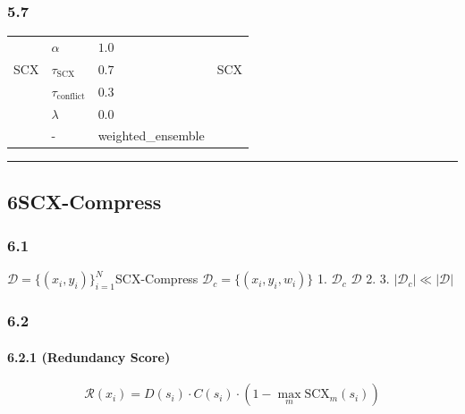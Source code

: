\documentclass[
  12pt,
]{article}
\begin{document}
\subsubsection{5.7 }\label{ux5173ux952eux8d85ux53c2ux6570-4}

\begin{longtable}[]{@{}llll@{}}
\toprule\noalign{}
 &  &  &  \\
\midrule\noalign{}
\endhead
\bottomrule\noalign{}
\endlastfoot
 & \(\alpha\) & \(1.0\) &  \\
SCX  & \(\tau_{\text{SCX}}\) & \(0.7\) & 
SCX \\
 & \(\tau_{\text{conflict}}\) & \(0.3\) &  \\
 & \(\lambda\) & \(0.0\) &  \\
 & - & weighted\_ensemble &  \\
\end{longtable}

\begin{center}\rule{0.5\linewidth}{0.5pt}\end{center}

\subsection{
6SCX-Compress}\label{ux6a21ux5757-6scx-compressux5197ux4f59ux538bux7f29}

\subsubsection{6.1 }\label{ux95eeux9898ux8bbeux5b9a-5}

 \(\mathcal{D} = \{(x_i, y_i)\}_{i=1}^N\)SCX-Compress
\textbf{}
\(\mathcal{D}_c = \{(x_i, y_i, w_i)\}\) 1.
\textbf{} \(\mathcal{D}_c\) 
\(\mathcal{D}\)  2.
\textbf{}
3. \textbf{}\(|\mathcal{D}_c| \ll |\mathcal{D}|\)

\subsubsection{6.2 }\label{ux6570ux5b66ux6a21ux578b-5}

\paragraph{6.2.1  (Redundancy
Score)}\label{ux5197ux4f59ux5206ux6570-redundancy-score}

\textbf{}

\[
\mathcal{R}(x_i) = D(s_i) \cdot C(s_i) \cdot \left(1 - \max_m \text{SCX}_m(s_i)\right)
\]
\end{document}
